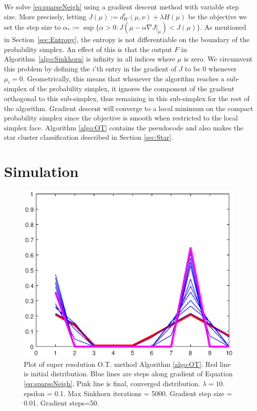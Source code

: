 \documentclass[conference]{IEEEtran}
\begin{document}
We solve \eqref{eq:sparseNeigh} using a gradient descent method with variable step size. More precisely, letting $J(\mu) := d_W^\epsilon(\mu,\nu) + \lambda H(\mu)$ be the objective we set the step size to $\alpha_* := \sup\{\alpha>0 : J(\mu-\alpha \nabla J|_\mu) < J(\mu)\}$. 
As mentioned in Section~\ref{sec:Entropy}, the entropy is not differentiable on the boundary of the probability simplex. 
An effect of this is that the output $F$ in Algorithm~\ref{algo:Sinkhorn} is infinity in all indices where $\mu$ is zero. 
We circumvent this problem by defining the $i$'th entry in the gradient of $J$ to be $0$ whenever $\mu_i=0$. Geometrically, this means that whenever the algorithm reaches a sub-simplex of the probability simplex, it ignores the component of the gradient orthogonal to this sub-simplex, thus remaining in this sub-simplex for the rest of the algorithm. 
Gradient descent will converge to a local minimum on the compact probability simplex since the objective is smooth when restricted to the local simplex face. Algorithm \ref{algo:OT} contains the pseudocode and also makes the star cluster classification described in Section \ref{sec:Star}.

\section{Simulation}

\begin{figure}[h]
\centerline{\includegraphics[width=.5\textwidth]{OT_gradient_descent_1D_lambda=10.eps}}
\caption{Plot of super resolution O.T. method Algorithm \ref{algo:OT}. Red line is initial distribution. Blue lines are steps along gradient of Equation \eqref{eq:sparseNeigh}. Pink line is final, converged distribution. $\lambda=10$.
epsilon = 0.1. Max Sinkhorn iterations = 5000. Gradient step size = 0.01. Gradient steps=50.}
\label{fig:low_sparse}
\end{figure}
\end{document}
